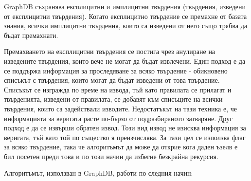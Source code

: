 \documentclass[12pt]{article}
\begin{document}
    GraphDB съхранява експлицитни и имплицитни твърдения (твърдения, изведени от експлицитни твърдения). Когато експлицитно твърдение се премахне от базата знания, всички имплицитни твърдения, които са изведени от него също трябва да бъдат премахнати.
    
    Премахването на експлицитни твърдения се постига чрез анулиране на изведените твърдения, които вече не могат да бъдат извлечени. Един подход е да се поддържа информация за проследяване за всяко твърдение - обикновено списъкът с твърдения, които могат да бъдат изведени от това твърдение. Списъкът се изгражда по време на извода, тъй като правилата се прилагат и твърденията, изведени от правилата, се добавят към списъците на всички твърдения, които са задействали изводите. Недостатъкът на тази техника е, че информацията за веригата расте по-бързо от подразбираното затваряне. Друг подход е да се извърши обратен извод. Този вид извод не изисква информация за веригата, тъй като той по същество я преизчислява. За тази цел се използва флаг за всяко твърдение, така че алгоритъмът да може да открие кога даден ъзелв е бил посетен преди това и по този начин да избегне безкрайна рекурсия.

    Алгоритъмът, използван в GraphDB, работи по следния начин:
\end{document}
